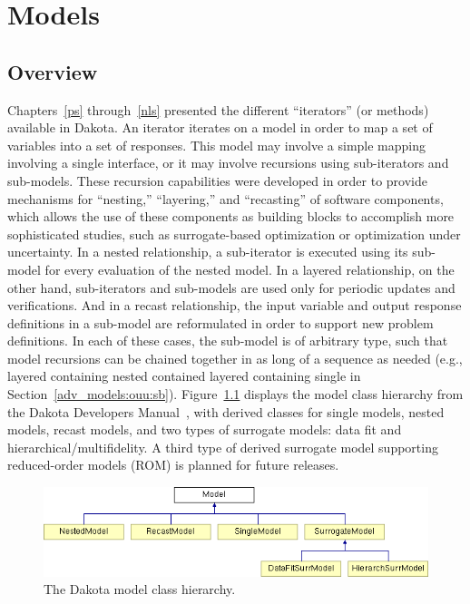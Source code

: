 \chapter{Models}\label{models}

\section{Overview}\label{models:overview}

Chapters~\ref{ps} through~\ref{nls} presented the different
``iterators'' (or methods) available in Dakota.  An iterator iterates
on a model in order to map a set of variables into a set of responses.
This model may involve a simple mapping involving a single interface,
or it may involve recursions using sub-iterators and sub-models.  These
recursion capabilities were developed in order to provide mechanisms
for ``nesting,'' ``layering,'' and ``recasting'' of software
components, which allows the use of these components as building
blocks to accomplish more sophisticated studies, such as
surrogate-based optimization or optimization under uncertainty.  In a
nested relationship, a sub-iterator is executed using its sub-model
for every evaluation of the nested model.  In a layered relationship,
on the other hand, sub-iterators and sub-models are used only for
periodic updates and verifications.  And in a recast relationship, the
input variable and output response definitions in a sub-model are
reformulated in order to support new problem definitions.  In each of
these cases, the sub-model is of arbitrary type, such that model
recursions can be chained together in as long of a sequence as needed
(e.g., layered containing nested contained layered containing single
in Section~\ref{adv_models:ouu:sb}).  Figure~\ref{model:hier} displays
the model class hierarchy from the Dakota Developers
Manual~\cite{DevMan}, with derived classes for single models, nested
models, recast models, and two types of surrogate models: data fit and
hierarchical/multifidelity.  A third type of derived surrogate model
supporting reduced-order models (ROM) is planned for future releases.

\begin{figure}
  \centering \includegraphics[scale=0.65]{images/classDakota_1_1Model}
  \caption{The Dakota model class hierarchy.}  \label{model:hier}
\end{figure}


